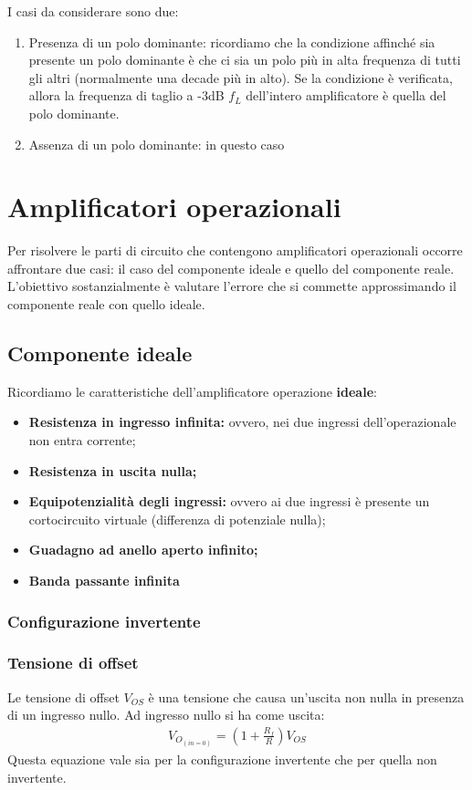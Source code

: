 \documentclass[a4paper,twocolumn,notitlepage]{book}
\begin{document}
	I casi da considerare sono due:
	\begin{enumerate}
		\item Presenza di un polo dominante: ricordiamo che la condizione affinché sia presente un polo dominante è che ci sia un polo più in alta frequenza di tutti gli altri (normalmente una decade più in alto). Se la condizione è verificata, allora la frequenza di taglio a -3dB $f_L$ dell'intero amplificatore è quella del polo dominante.
		
		\item Assenza di un polo dominante: in questo caso
	\end{enumerate}
	
	\section*{Amplificatori operazionali}
	Per risolvere le parti di circuito che contengono amplificatori operazionali occorre affrontare due casi: il caso del componente ideale e quello del componente reale. L'obiettivo sostanzialmente è valutare l'errore che si commette approssimando il componente reale con quello ideale.
	\subsection*{Componente ideale}
	Ricordiamo le caratteristiche dell'amplificatore operazione \textbf{ideale}:
	\begin{itemize}
		\item \textbf{Resistenza in ingresso infinita:} ovvero, nei due ingressi dell'operazionale non entra corrente;
		\item \textbf{Resistenza in uscita nulla;}
		\item \textbf{Equipotenzialità degli ingressi:} ovvero ai due ingressi è presente un cortocircuito virtuale (differenza di potenziale nulla);
		\item \textbf{Guadagno ad anello aperto infinito;}
		\item \textbf{Banda passante infinita}
	\end{itemize}
	\subsubsection*{Configurazione invertente}
	\subsubsection*{Tensione di offset}
	Le tensione di offset $V_{OS}$ è una tensione che causa un'uscita non nulla in presenza di un ingresso nullo. 
	Ad ingresso nullo si ha come uscita:
	\begin{align*}
		V_{O_{(in=0)}}= \left ( 1+\frac{R_f}{R} \right ) V_{OS}
	\end{align*}
	Questa equazione vale sia per la configurazione invertente che per quella non invertente.
	
\end{document}

